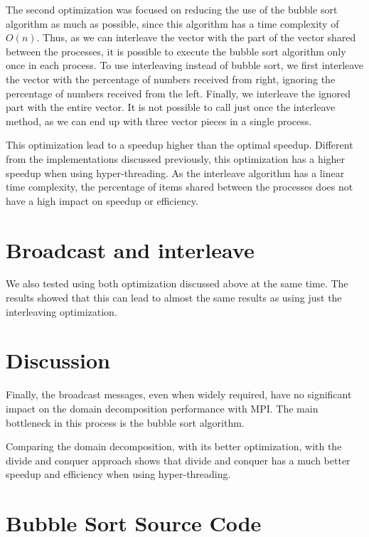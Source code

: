 \documentclass[10pt,twocolumn]{article}
\begin{document}
The second optimization was focused on reducing the use of the bubble sort algorithm as much as possible, since this algorithm has a time complexity of $O(n)$. Thus, as we can interleave the vector with the part of the vector shared between the processes, it is possible to execute the bubble sort algorithm only once in each process. To use interleaving instead of bubble sort, we first interleave the vector with the percentage of numbers received from right, ignoring the percentage of numbers received from the left. Finally, we interleave the ignored part with the entire vector. It is not possible to call just once the interleave method, as we can end up with three vector pieces in a single process.

This optimization lead to a speedup higher than the optimal speedup. Different from the implementations discussed previously, this optimization has a higher speedup when using hyper-threading. As the interleave algorithm has a linear time complexity, the percentage of items shared between the processes does not have a high impact on speedup or efficiency.


\section*{Broadcast and interleave}

We also tested using both optimization discussed above at the same time. The results showed that this can lead to almost the same results as using just the interleaving optimization.


\section*{Discussion}

Finally, the broadcast messages, even when widely required, have no significant impact on the domain decomposition performance with MPI. The main bottleneck in this process is the bubble sort algorithm.

Comparing the domain decomposition, with its better optimization, with the divide and conquer approach shows that divide and conquer has a much better speedup and efficiency when using hyper-threading.

\onecolumn

\section*{Bubble Sort Source Code}



\end{document}

